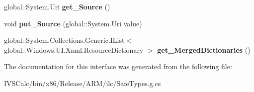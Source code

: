 \begin{DoxyCompactItemize}
global\+::\+System.\+Uri {\bfseries get\+\_\+\+Source} ()
\item 
\mbox{\label{interface_windows_1_1_u_i_1_1_xaml_1_1_i_resource_dictionary_a8d5669e35c8e6ad0622049bf239bc760}} 
void {\bfseries put\+\_\+\+Source} (global\+::\+System.\+Uri value)
\item 
\mbox{\label{interface_windows_1_1_u_i_1_1_xaml_1_1_i_resource_dictionary_a5bfd581ecb0bf11f53eb2e228d657388}} 
global\+::\+System.\+Collections.\+Generic.\+I\+List$<$ global\+::\+Windows.\+U\+I.\+Xaml.\+Resource\+Dictionary $>$ {\bfseries get\+\_\+\+Merged\+Dictionaries} ()
\end{DoxyCompactItemize}


The documentation for this interface was generated from the following file\+:\begin{DoxyCompactItemize}
\item 
I\+V\+S\+Calc/bin/x86/\+Release/\+A\+R\+M/ilc/Safe\+Types.\+g.\+cs\end{DoxyCompactItemize}
